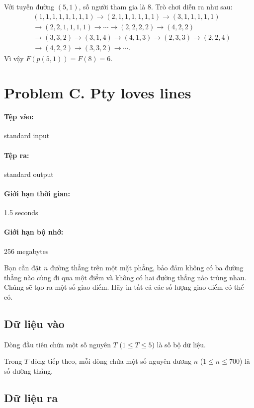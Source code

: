 \documentclass[11pt]{article}
\begin{document}
Với tuyến đường \((5,1)\), số người tham gia là \(8\). Trò chơi diễn ra như
sau:
\[
\begin{aligned}
 &(1,1,1,1,1,1,1,1)\to(2,1,1,1,1,1,1)\to(3,1,1,1,1,1)\\
 &\to(2,2,1,1,1,1)\to\cdots\to(2,2,2,2)\to(4,2,2)\\
 &\to(3,3,2)\to(3,1,4)\to(4,1,3)\to(2,3,3)\to(2,2,4)\\
 &\to(4,2,2)\to(3,3,2)\to\cdots .
\end{aligned}
\]
Vì vậy \(F(p(5,1))=F(8)=6\).

\section{Problem C. Pty loves lines}

\paragraph{Tệp vào:} standard input
\paragraph{Tệp ra:} standard output
\paragraph{Giới hạn thời gian:} 1.5 seconds
\paragraph{Giới hạn bộ nhớ:} 256 megabytes

Bạn cần đặt \(n\) đường thẳng trên một mặt phẳng, bảo đảm không có ba đường
thẳng nào cùng đi qua một điểm và không có hai đường thẳng nào trùng nhau.
Chúng sẽ tạo ra một số giao điểm. Hãy in tất cả các số lượng giao điểm có thể
có.

\subsection*{Dữ liệu vào}

Dòng đầu tiên chứa một số nguyên \(T\) (\(1\le T\le 5\)) là số bộ dữ liệu.

Trong \(T\) dòng tiếp theo, mỗi dòng chứa một số nguyên dương \(n\)
(\(1\le n\le 700\)) là số đường thẳng.

\subsection*{Dữ liệu ra}
\end{document}
